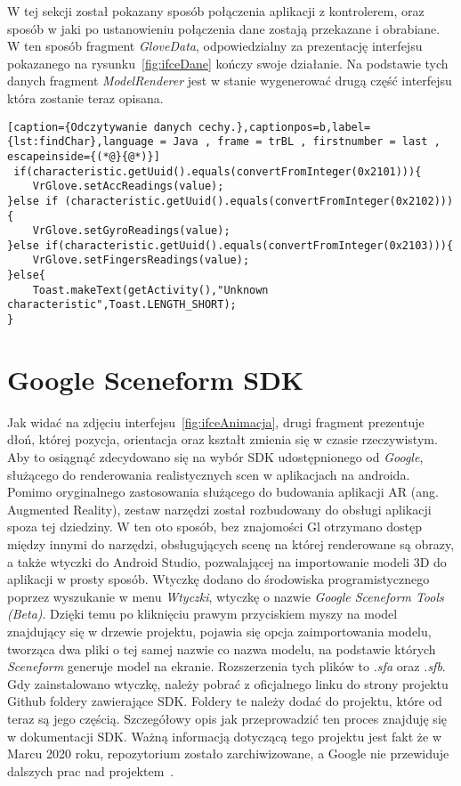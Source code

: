 W tej sekcji został pokazany sposób połączenia aplikacji z kontrolerem, oraz sposób w jaki po ustanowieniu połączenia dane zostają przekazane i obrabiane. W ten sposób fragment \textit{GloveData}, odpowiedzialny za prezentację interfejsu pokazanego na rysunku~\ref{fig:ifceDane} kończy swoje działanie. Na podstawie tych danych fragment \textit{ModelRenderer} jest w stanie wygenerować drugą część interfejsu która zostanie teraz opisana.
\begin{lstlisting}[caption={Odczytywanie danych cechy.},captionpos=b,label={lst:findChar},language = Java , frame = trBL , firstnumber = last , escapeinside={(*@}{@*)}]     
 if(characteristic.getUuid().equals(convertFromInteger(0x2101))){
	VrGlove.setAccReadings(value);
}else if (characteristic.getUuid().equals(convertFromInteger(0x2102))){
	VrGlove.setGyroReadings(value);
}else if(characteristic.getUuid().equals(convertFromInteger(0x2103))){
	VrGlove.setFingersReadings(value);
}else{
	Toast.makeText(getActivity(),"Unknown characteristic",Toast.LENGTH_SHORT);
}                                                   
\end{lstlisting}

\section{Google Sceneform SDK}
\label{sec:sceneform}
Jak widać na zdjęciu interfejsu~\ref{fig:ifceAnimacja}, drugi fragment prezentuje dłoń, której pozycja, orientacja oraz kształt zmienia się w czasie rzeczywistym. Aby to osiągnąć zdecydowano się na wybór SDK udostępnionego od \textit{Google}, służącego do renderowania realistycznych scen w aplikacjach na androida. Pomimo oryginalnego zastosowania służącego do budowania aplikacji AR (ang. Augmented Reality), zestaw narzędzi został rozbudowany do obsługi aplikacji spoza tej dziedziny. W ten oto sposób, bez znajomości Gl otrzymano dostęp między innymi do narzędzi, obsługujących scenę na której renderowane są obrazy, a także wtyczki do Android Studio, pozwalającej na importowanie modeli 3D do aplikacji w prosty sposób. Wtyczkę dodano do środowiska programistycznego poprzez wyszukanie w menu \textit{Wtyczki}, wtyczkę o nazwie \textit{Google Sceneform Tools (Beta)}. Dzięki temu po kliknięciu prawym przyciskiem myszy na model znajdujący się w drzewie projektu, pojawia się opcja zaimportowania modelu, tworząca dwa pliki o tej samej nazwie co nazwa modelu, na podstawie których \textit{Sceneform} generuje model na ekranie. Rozszerzenia tych plików to \textit{.sfa} oraz \textit{.sfb}. Gdy zainstalowano wtyczkę, należy pobrać z oficjalnego linku do strony projektu Github foldery zawierające SDK. Foldery te należy dodać do projektu, które od teraz są jego częścią. Szczegółowy opis jak przeprowadzić ten proces znajduję się w dokumentacji SDK. Ważną informacją dotyczącą tego projektu jest fakt że w Marcu 2020 roku, repozytorium zostało zarchiwizowane, a Google nie przewiduje dalszych prac nad projektem~\cite{sceneform}.

